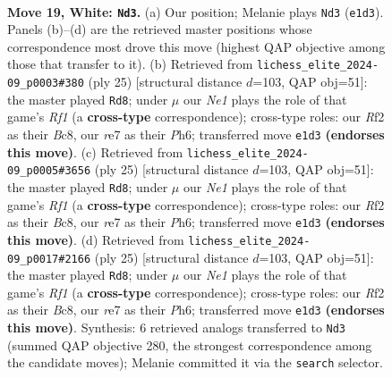 \documentclass[11pt]{article}
\begin{document}
\clearpage

\begin{figure}[p]\centering
\begin{subfigure}{0.46\textwidth}\centering
\resizebox{\linewidth}{!}{%
\newchessgame
\chessboard[
  setfen={5rk1/3brppp/4pn2/p1pq4/n7/4P1P1/PP2BRPP/RNQ1N1K1 w - - 2 19},
  showmover=false,
  pgfstyle=straightmove, color=movearrow, markmove={e1-d3}
]}
\caption{}
\end{subfigure}\hfill
\begin{subfigure}{0.46\textwidth}\centering
\resizebox{\linewidth}{!}{%
\newchessgame
\chessboard[
  setfen={rnb2rk1/pp2qpp1/4p2p/b7/2BQN3/P3PN2/1P3PPP/2R2RK1 b - - 0 13},
  showmover=false,
  pgfstyle=straightmove, color=movearrow, markmove={f8-d8}
]}
\caption{}
\end{subfigure}
\\[4pt]
\begin{subfigure}{0.46\textwidth}\centering
\resizebox{\linewidth}{!}{%
\newchessgame
\chessboard[
  setfen={rnb2rk1/pp2qpp1/4p2p/b7/2BQN3/P3PN2/1P3PPP/2R2RK1 b - - 0 13},
  showmover=false,
  pgfstyle=straightmove, color=movearrow, markmove={f8-d8}
]}
\caption{}
\end{subfigure}\hfill
\begin{subfigure}{0.46\textwidth}\centering
\resizebox{\linewidth}{!}{%
\newchessgame
\chessboard[
  setfen={rnb2rk1/pp2qpp1/4p2p/b7/2BQN3/P3PN2/1P3PPP/2R2RK1 b - - 0 13},
  showmover=false,
  pgfstyle=straightmove, color=movearrow, markmove={f8-d8}
]}
\caption{}
\end{subfigure}
\caption{\textbf{Move 19, White: \texttt{Nd3}.} (a) Our position; Melanie plays \texttt{Nd3} (\texttt{e1d3}). Panels (b)--(d) are the retrieved master positions whose correspondence most drove this move (highest QAP objective among those that transfer to it). (b) Retrieved from \texttt{lichess\_elite\_2024-09\_p0003\#380} (ply 25) [structural distance $d$=103, QAP obj=51]: the master played \texttt{Rd8}; under $\mu$ our \emph{Ne1} plays the role of that game's \emph{Rf1} (a \textbf{cross-type} correspondence); cross-type roles: our \emph{R}f2 as their \emph{B}c8, our \emph{r}e7 as their \emph{P}h6; transferred move \texttt{e1d3} \textbf{(endorses this move)}. (c) Retrieved from \texttt{lichess\_elite\_2024-09\_p0005\#3656} (ply 25) [structural distance $d$=103, QAP obj=51]: the master played \texttt{Rd8}; under $\mu$ our \emph{Ne1} plays the role of that game's \emph{Rf1} (a \textbf{cross-type} correspondence); cross-type roles: our \emph{R}f2 as their \emph{B}c8, our \emph{r}e7 as their \emph{P}h6; transferred move \texttt{e1d3} \textbf{(endorses this move)}. (d) Retrieved from \texttt{lichess\_elite\_2024-09\_p0017\#2166} (ply 25) [structural distance $d$=103, QAP obj=51]: the master played \texttt{Rd8}; under $\mu$ our \emph{Ne1} plays the role of that game's \emph{Rf1} (a \textbf{cross-type} correspondence); cross-type roles: our \emph{R}f2 as their \emph{B}c8, our \emph{r}e7 as their \emph{P}h6; transferred move \texttt{e1d3} \textbf{(endorses this move)}. Synthesis: 6 retrieved analogs transferred to \texttt{Nd3} (summed QAP objective 280, the strongest correspondence among the candidate moves); Melanie committed it via the \texttt{search} selector.}

\end{figure}
\end{document}
